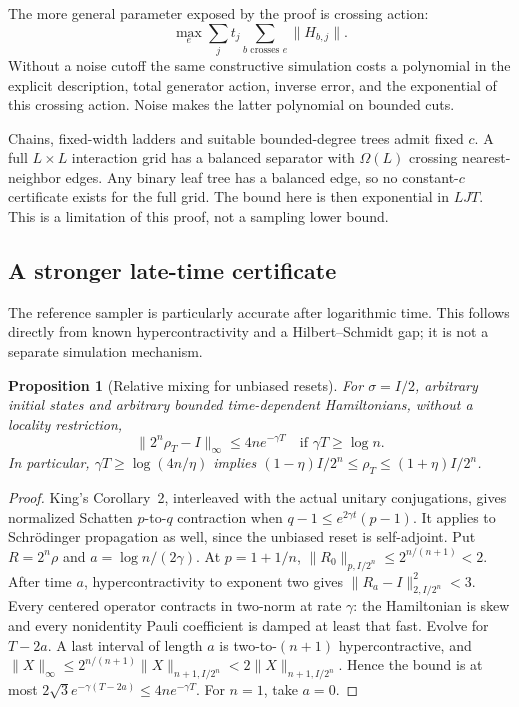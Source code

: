 \documentclass[11pt,reqno]{amsart}
\numberwithin{equation}{section}
\newtheorem{proposition}[theorem]{Proposition}
\theoremstyle{definition}
\theoremstyle{remark}
\newcommand{\nn}[1]{\lVert#1\rVert}
\begin{document}
The more general parameter exposed by the proof is crossing action:
\[
 \max_e\sum_jt_j\sum_{b\text{ crosses }e}\nn{H_{b,j}}.
\]
Without a noise cutoff the same constructive simulation costs a polynomial in the explicit description, total generator action, inverse error, and the exponential of this crossing action. Noise makes the latter polynomial on bounded cuts.

Chains, fixed-width ladders and suitable bounded-degree trees admit fixed $c$. A full $L\times L$ interaction grid has a balanced separator with $\Omega(L)$ crossing nearest-neighbor edges. Any binary leaf tree has a balanced edge, so no constant-$c$ certificate exists for the full grid. The bound here is then exponential in $LJT$. This is a limitation of this proof, not a sampling lower bound.

\subsection{A stronger late-time certificate}
The reference sampler is particularly accurate after logarithmic time. This follows directly from known hypercontractivity and a Hilbert--Schmidt gap; it is not a separate simulation mechanism.

\begin{proposition}[Relative mixing for unbiased resets]\label{prop:relative}
For $\sigma=I/2$, arbitrary initial states and arbitrary bounded time-dependent Hamiltonians, without a locality restriction,
\begin{equation}\label{eq:relative}
 \nn{2^n\rho_T-I}_\infty\leq4ne^{-\gamma T}
 \quad\text{if }\gamma T\geq\log n.
\end{equation}
In particular, $\gamma T\geq\log(4n/\eta)$ implies
$(1-\eta)I/2^n\leq\rho_T\leq(1+\eta)I/2^n$.
\end{proposition}
\begin{proof}
King's Corollary~2, interleaved with the actual unitary conjugations, gives normalized Schatten $p$-to-$q$ contraction when $q-1\leq e^{2\gamma t}(p-1)$. It applies to Schr\"odinger propagation as well, since the unbiased reset is self-adjoint. Put $R=2^n\rho$ and $a=\log n/(2\gamma)$. At $p=1+1/n$, $\nn{R_0}_{p,I/2^n}\leq2^{n/(n+1)}<2$. After time $a$, hypercontractivity to exponent two gives
$\nn{R_a-I}_{2,I/2^n}^2<3$.
Every centered operator contracts in two-norm at rate $\gamma$: the Hamiltonian is skew and every nonidentity Pauli coefficient is damped at least that fast. Evolve for $T-2a$. A last interval of length $a$ is two-to-$(n+1)$ hypercontractive, and $\nn X_\infty\leq2^{n/(n+1)}\nn X_{n+1,I/2^n}<2\nn X_{n+1,I/2^n}$. Hence the bound is at most $2\sqrt3 e^{-\gamma(T-2a)}\leq4ne^{-\gamma T}$. For $n=1$, take $a=0$.
\end{proof}
\end{document}
